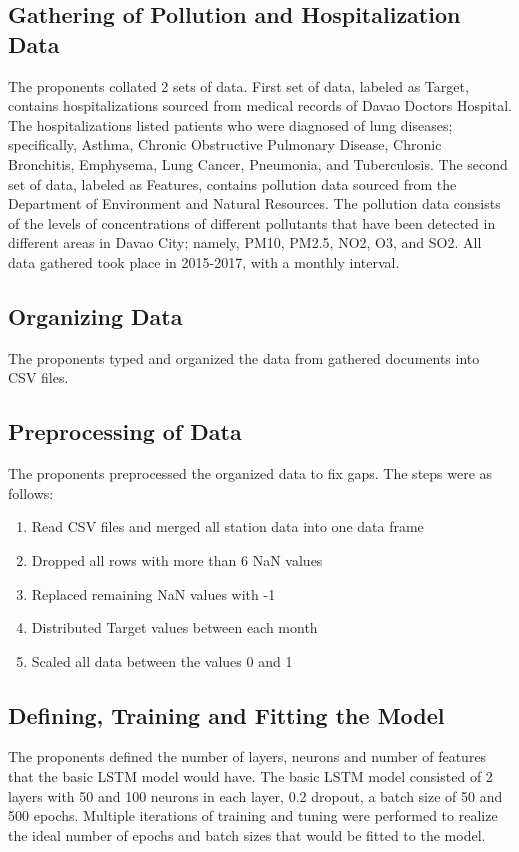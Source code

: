 \documentclass[10pt,11pt,12pt,oneside]{book}
\begin{document}
    \subsection{Gathering of Pollution and Hospitalization Data}
    The proponents collated 2 sets of data. First set of data, labeled as Target, contains hospitalizations sourced from medical records of Davao Doctors Hospital. The hospitalizations listed patients who were diagnosed of lung diseases; specifically, Asthma, Chronic Obstructive Pulmonary Disease, Chronic Bronchitis, Emphysema, Lung Cancer, Pneumonia, and Tuberculosis. The second set of data, labeled as Features, contains pollution data sourced from the Department of Environment and Natural Resources. The pollution data consists of the levels of concentrations of different pollutants that have been detected in different areas in Davao City; namely, PM10, PM2.5, NO2, O3, and SO2. All data gathered took place in 2015-2017, with a monthly interval.  
    \subsection{Organizing Data}
    The proponents typed and organized the data from gathered documents into CSV files.
    \subsection{Preprocessing of Data}
    The proponents preprocessed the organized data to fix gaps. The steps were as follows:
    \begin{enumerate}
        \item Read CSV files and merged all station data into one data frame
        \item Dropped all rows with more than 6 NaN values
        \item Replaced remaining NaN values with -1
        \item Distributed Target values between each month
        \item Scaled all data between the values 0 and 1
    \end{enumerate}
    \subsection{Defining, Training and Fitting the Model}
    The proponents defined the number of layers, neurons and number of features that the basic LSTM model would have. The basic LSTM model consisted of 2 layers with 50 and 100 neurons in each layer, 0.2 dropout, a batch size of 50 and 500 epochs. Multiple iterations of training and tuning were performed to realize the ideal number of epochs and batch sizes that would be fitted to the model.
\end{document}
